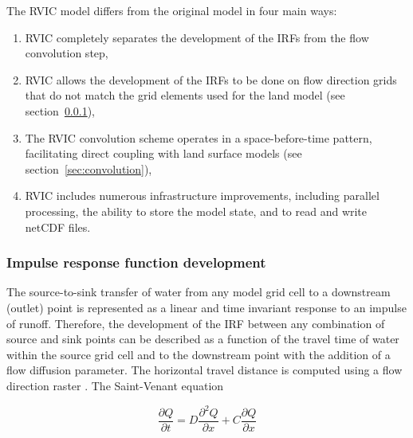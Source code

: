 \documentclass[jgrga, draft]{agutex}
\begin{document}
\begin{article}
The RVIC model differs from the original \citet{Lohmann_1996} model in four main ways:

\begin{enumerate}
\item RVIC completely separates the development of the IRFs from the flow convolution step,
\item RVIC allows the development of the IRFs to be done on flow direction grids that do not match the grid elements used for the land model (see section~\ref{sec:irfs}),
\item The RVIC convolution scheme operates in a space-before-time pattern, facilitating direct coupling with land surface models (see section~\ref{sec:convolution}),
\item RVIC includes numerous infrastructure improvements, including parallel processing, the ability to store the model state, and to read and write netCDF files.
\end{enumerate}

\subsubsection{Impulse response function development}
\label{sec:irfs}

The source-to-sink transfer of water from any model grid cell to a downstream (outlet) point is represented as a linear and time invariant response to an impulse of runoff.
Therefore, the development of the IRF between any combination of source and sink points can be described as a function of the travel time of water within the source grid cell and to the downstream point with the addition of a flow diffusion parameter. 
The horizontal travel distance is computed using a flow direction raster \citep[e.g.][]{Wu_2011}.
The Saint-Venant equation

 \begin{equation}
   \label{eq:StVenant}
   \frac{\partial Q}{\partial t} = D \frac{\partial^2 Q}{\partial x} + C \frac{\partial Q}{\partial x}
 \end{equation}


\end{article}
\end{document}
